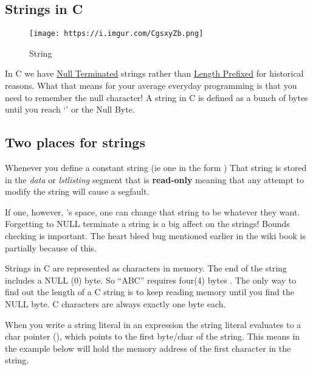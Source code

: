 \subsection{Strings in C}

\begin{figure}[htbp]
	\centering
	\texttt{[image: https://i.imgur.com/CgsxyZb.png]}
	\caption{String}
\end{figure}

In C we have
\href{https://en.wikipedia.org/wiki/Null-terminated_string}{Null
	Terminated} strings rather than
\href{https://en.wikipedia.org/wiki/String_(computer_science)\#Length-prefixed}{Length
	Prefixed} for historical reasons. What that means for your average
everyday programming is that you need to remember the null character! A
string in C is defined as a bunch of bytes until you reach `\0' or the
Null Byte.

\subsection{Two places for strings}\label{two-places-for-strings}

Whenever you define a constant string (ie one in the form ) That string is stored in the \emph{data} or \emph{lstlisting} segment that is \textbf{read-only} meaning that any attempt to modify the string will cause a segfault.

If one, however, 's space, one can change that string to be whatever they want. Forgetting to NULL terminate a string is a big affect on the strings! Bounds checking is important. The heart bleed bug mentioned earlier in the wiki book is partially because of this.

Strings in C are represented as characters in memory. The end of the string includes a NULL (0) byte. So ``ABC'' requires four(4) bytes .
The only way to find out the length of a C string is to keep reading memory until you find the NULL byte. C characters are always exactly one byte each.

When you write a string literal  in an expression the string literal evaluates to a char pointer (), which points to the first byte/char of the string. This means  in the example below will hold the memory address of the first character in the string.


